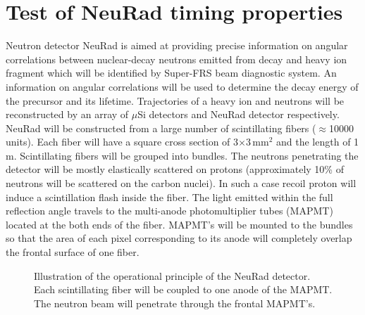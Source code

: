 \documentclass{webofc}
\begin{document}
\section{Test of NeuRad timing properties}
Neutron detector NeuRad is aimed at providing precise information on angular correlations between nuclear-decay neutrons emitted from decay and heavy ion fragment which will be identified by Super-FRS beam diagnostic system. An information on angular correlations will be used to determine the decay energy of the precursor and its lifetime. Trajectories of a heavy ion and neutrons will be reconstructed by an array of $\mu$Si detectors and NeuRad detector respectively. %
NeuRad will be constructed from a large number of scintillating fibers ($\approx$10000 units). Each fiber will have a square cross section of 3$\times$3\,mm$^2$ and the length of 1\,m. Scintillating fibers will be grouped into bundles. 
The neutrons penetrating the detector will be mostly elastically scattered on protons (approximately 10\% of neutrons will be scattered on the carbon nuclei). In such a case recoil proton will induce a scintillation flash inside the fiber. The light emitted within the full reflection angle travels to the multi-anode photomultiplier tubes (MAPMT) located at the both ends of the fiber.
MAPMT's will be mounted to the bundles so that the area of each pixel corresponding to its anode will completely overlap the frontal surface of one fiber.

\begin{figure}[h]
	\caption{Illustration of the operational principle of the NeuRad detector. Each scintillating fiber will be coupled to one anode of the MAPMT. The neutron beam will penetrate through the frontal MAPMT's.}
	\label{ris:neuradPrinciple}
\end{figure}
\end{document}
